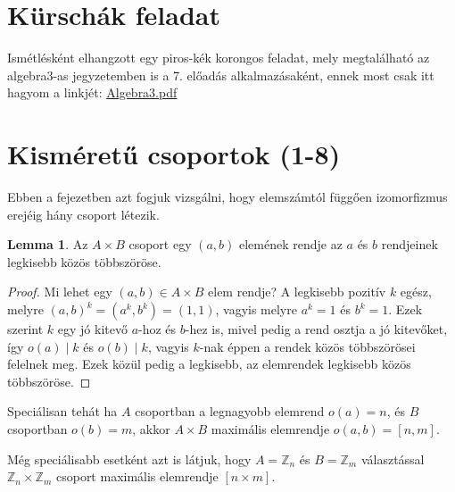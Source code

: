 \documentclass[12pt]{book}
\theoremstyle{plain} %
\theoremstyle{definition} %
\newtheorem{lem/}{Lemma}[section]
\newenvironment{lem}
  {\renewcommand{\qedsymbol}{$\clubsuit$}%
   \pushQED{\qed}\begin{lem/}}
  {\popQED\end{lem/}}
\theoremstyle{remark}
\renewcommand\qedsymbol{$\blacksquare$}
\numberwithin{equation}{section}  %
\def\Z{\mathbb{Z}}
\begin{document}
	
	\section{Kürschák feladat}
	
	Ismétlésként elhangzott egy piros-kék korongos feladat, mely megtalálható az algebra3-as jegyzetemben is a 7. előadás alkalmazásaként, ennek most csak itt hagyom a linkjét:  \href{http://vasgyura96.web.elte.hu/files/algebra3.pdf}{Algebra3.pdf}
	
	
	\section{Kisméretű csoportok (1-8)}
	Ebben a fejezetben azt fogjuk vizsgálni, hogy elemszámtól függően izomorfizmus erejéig hány csoport létezik.
	
	
	\begin{lem}\label{maxrend}
		Az $A\times B$ csoport egy $(a,b)$ elemének rendje az $a$ és $b$ rendjeinek legkisebb közös többszöröse.
	\end{lem}

	\begin{proof}
		Mi lehet egy $(a,b)\in A\times B$ elem rendje? A legkisebb pozitív $k$ egész, melyre $(a,b)^k = (a^k,b^k) = (1,1)$, vagyis melyre $a^k = 1$ és $b^k=1$. Ezek szerint $k$ egy jó kitevő $a$-hoz és $b$-hez is, mivel pedig a rend osztja a jó kitevőket, így $o(a)\mid k$ és $o(b) \mid k$, vagyis $k$-nak éppen a rendek közös többszörösei felelnek meg. Ezek közül pedig a legkisebb, az elemrendek legkisebb közös többszöröse.
	\end{proof}

	Speciálisan tehát ha $A$ csoportban a legnagyobb elemrend $o(a) = n$, és $B$ csoportban $o(b) = m$, akkor $A\times B$ maximális elemrendje $o(a,b)  =[n,m]$.
	
	Még speciálisabb esetként azt is látjuk, hogy $A=\Z_n$ és $B=\Z_m$ választással $\Z_n\times \Z_m$ csoport maximális elemrendje $[n\times m]$.
	
	
\end{document}
